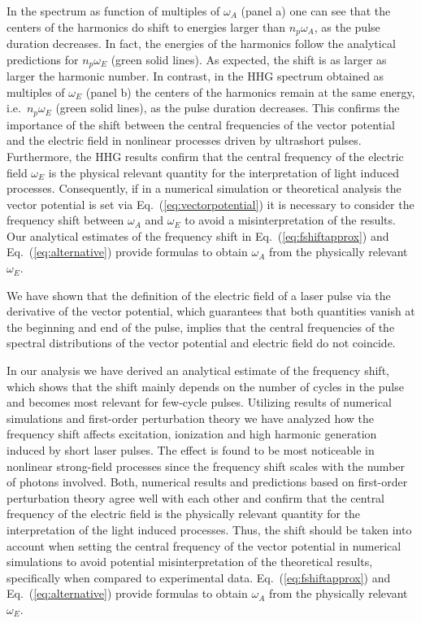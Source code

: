In the spectrum as function of multiples of $\omega_A$ (panel a) one can see that the centers of the harmonics do shift to energies larger than $n_p\omega_A$, as the pulse duration decreases. In fact, the energies of the harmonics follow the analytical predictions for $n_p\omega_E$ (green solid lines). As expected, the shift is as larger as larger the harmonic number. In contrast, in the HHG spectrum obtained as multiples of $\omega_E$ (panel b) the centers of the harmonics remain at the same energy, i.e.~$n_p\omega_E$ (green solid lines), as the pulse duration decreases. This confirms the importance of the shift between the central frequencies of the vector potential and the electric field in nonlinear processes driven by ultrashort pulses. Furthermore, the HHG results confirm that the central frequency of the electric field $\omega_E$ is the physical relevant quantity for the interpretation of light induced processes. Consequently, if in a numerical simulation or theoretical analysis the vector potential is set via Eq.~(\ref{eq:vectorpotential}) it is necessary to consider the frequency shift between $\omega_A$ and $\omega_E$ to avoid a misinterpretation of the results. Our analytical estimates of the frequency shift in Eq.~(\ref{eq:fshiftapprox}) and Eq.~(\ref{eq:alternative}) provide formulas to obtain $\omega_A$ from the physically relevant $\omega_E$.


We have shown that the definition of the electric field of a laser pulse via the derivative of the vector potential, which guarantees that both quantities vanish at the beginning and end of the pulse, implies that the central frequencies of the spectral distributions of the vector potential and electric field do not coincide. 

In our analysis we have derived an analytical estimate of the frequency shift, which shows that the shift mainly depends on the number of cycles in the pulse and becomes most relevant for few-cycle pulses. Utilizing results of numerical simulations and first-order perturbation theory we have analyzed how the frequency shift affects excitation, ionization and high harmonic generation induced by short laser pulses. The effect is found to be most noticeable in nonlinear strong-field processes since the frequency shift scales with the number of photons involved. Both, numerical results and predictions based on first-order perturbation theory agree well with each other and confirm that the central frequency of the electric field is the physically relevant quantity for the interpretation of the light induced processes. Thus, the shift should be taken into account when setting the central frequency of the vector potential in numerical simulations to avoid potential misinterpretation of the theoretical results, specifically when compared to experimental data. Eq.~(\ref{eq:fshiftapprox}) and Eq.~(\ref{eq:alternative}) provide formulas to obtain $\omega_A$ from the physically relevant $\omega_E$.



